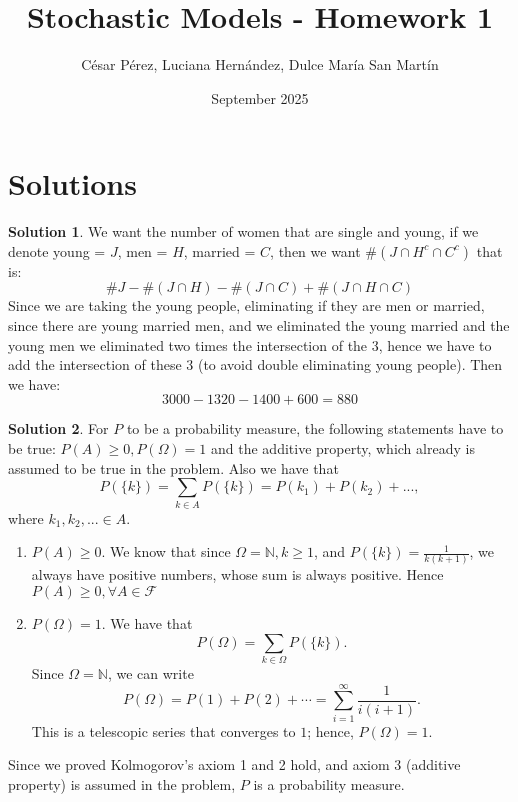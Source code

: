 \documentclass{article}
\title{Stochastic Models - Homework 1}
\author{César Pérez, Luciana Hernández, Dulce María San Martín}
\date{September 2025}
\begin{document}
\theoremstyle{definition}
\newtheorem{solutions}{Solution}
\maketitle

\section*{Solutions}
    \begin{minipage}{\linewidth}
        \begin{solutions}
            We want the number of women that are single and young, if we denote young = $J$, men = $H$, married = $C$, then we want $\#(J \cap H^{c} \cap C^c)$ that is:
            \[
                \#J - \#(J \cap H) - \#(J \cap C) + \#(J \cap H \cap C)
            \]
            Since we are taking the young people, eliminating if they are men or married, since there are young married men, and we eliminated the young married and the young men we eliminated two times the intersection of the 3, hence we have to add the intersection of these 3 (to avoid double eliminating young people). Then we have:
            \[
                3000 - 1320 - 1400 + 600 = 880
            \]
        \end{solutions}
        \medskip
    \end{minipage}
    \begin{minipage}{\linewidth}
        \begin{solutions}
            For $P$ to be a probability measure, the following statements have to be true: $P(A) \geq 0, P(\Omega) = 1$ and the additive property, which already is assumed to be true in the problem.
            Also we have that 
            \[
                P(\{k\}) = \sum_{k \in A}P(\{k\}) = P(k_1) + P(k_2) + ..., 
            \]
            where $k_1, k_2, ... \in A$.
                \begin{enumerate}
                    \item $P(A) \geq 0$. We know that since $\Omega = \mathbb{N}, k \geq 1$, and $P(\{k\}) = \frac{1}{k(k+1)}$, we always have positive numbers, whose sum is always positive. Hence $P(A) \geq 0, \forall A \in \mathcal{F}$
                    \item $P(\Omega) = 1$.
                    We have that 
                    \[
                        P(\Omega) = \sum_{k \in \Omega} P(\{k\}).
                    \]
                    Since $\Omega = \mathbb{N}$, we can write 
                    \[
                        P(\Omega) = P(1) + P(2) + \cdots 
                        = \sum_{i = 1}^{\infty} \frac{1}{i(i + 1)}.
                    \]
                    This is a telescopic series that converges to $1$; hence, $P(\Omega) = 1$.
                \end{enumerate}
            Since we proved Kolmogorov's axiom 1 and 2 hold, and axiom 3 (additive property) is assumed in the problem, $P$ is a probability measure. 
        \end{solutions}
    \end{minipage}
\end{document}
